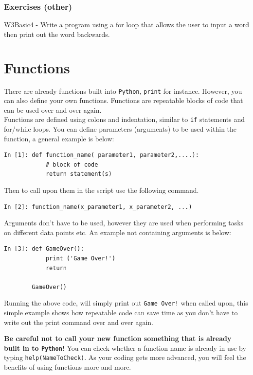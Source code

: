 \subsubsection{Exercises (other)}

W3Basic4 - Write a program using a for loop that allows the user to input a word then print out the word backwards.
 
\section{Functions}
\label{sec:function}
There are already functions built into \texttt{Python}, {\tt print} for instance. However, you can also define your own functions. Functions are repeatable blocks of code that can be used over and over again. \\

\noindent Functions are defined using colons and indentation, similar to \texttt{if} statements and for/while loops. You can define parameters (arguments) to be used within the function, a general example is below:
\begin{lstlisting}[style=PY]
In [1]: def function_name( parameter1, parameter2,....):
            # block of code
            return statement(s)
\end{lstlisting}
Then to call upon them in the script use the following command.
\begin{lstlisting}[style=PY]
In [2]: function_name(x_parameter1, x_parameter2, ...)
\end{lstlisting}
Arguments don't have to be used, however they are used when performing tasks on different data points etc. An example not containing arguments is below:
\begin{lstlisting}[style=PY]
In [3]: def GameOver():
            print ('Game Over!')
            return

        GameOver()
\end{lstlisting}
Running the above code, will simply print out \texttt{Game Over!} when called upon, this simple example shows how repeatable code can save time as you don't have to write out the print command over and over again.

{\bf Be careful not to call your new function something that is already built in to \texttt{Python}!} You can check whether a function name is already in use by typing {\tt help(NameToCheck)}. As your coding gets more advanced, you will feel the benefits of using functions more and more. \\

